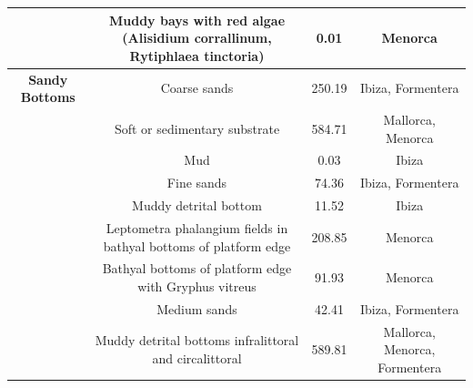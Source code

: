 \begin{table}
{\begin{tabular}{|c|c|c|c|}
            \\
                                              & Muddy bays with red algae
            (Alisidium corrallinum, Rytiphlaea
            tinctoria)                        & 0.01
                                              & Menorca
            \\
            \hline
            \textbf{Sandy Bottoms}            & Coarse sands
                                              & 250.19
                                              & Ibiza, Formentera
            \\
                                              & Soft or sedimentary substrate
                                              & 584.71
                                              & Mallorca, Menorca
            \\
                                              & Mud
                                              & 0.03
                                              & Ibiza
            \\
                                              & Fine sands
                                              & 74.36
                                              & Ibiza, Formentera
            \\
                                              & Muddy detrital bottom
                                              & 11.52
                                              & Ibiza
            \\
                                              & Leptometra phalangium fields in
            bathyal bottoms of platform edge
                                              & 208.85
                                              & Menorca
            \\
                                              & Bathyal bottoms of platform
            edge
            with Gryphus vitreus              & 91.93
                                              &
            Menorca

            \\
                                              & Medium sands
                                              & 42.41
                                              & Ibiza, Formentera
            \\
                                              & Muddy detrital bottoms
            infralittoral and circalittoral   & 589.81
                                              &
            Mallorca, Menorca, Formentera


\end{tabular}}
\end{table}

